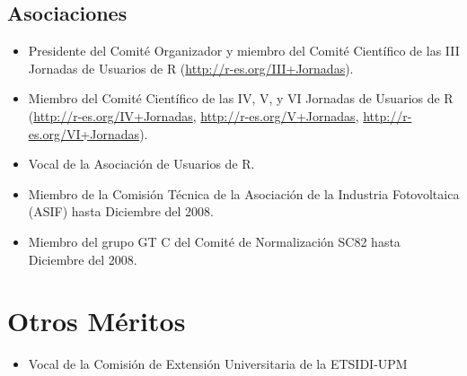 \documentclass[article, a4paper]{memoir}
\begin{document}
\subsection{Asociaciones}
\label{sec-15-4}

\begin{itemize}
\item Presidente del Comité Organizador y miembro del Comité Científico de las III Jornadas de Usuarios de R (\url{http://r-es.org/III+Jornadas}).

\item Miembro del Comité Científico de las IV, V, y VI Jornadas de Usuarios de R (\url{http://r-es.org/IV+Jornadas}, \url{http://r-es.org/V+Jornadas}, \url{http://r-es.org/VI+Jornadas}).

\item Vocal de la Asociación de Usuarios de R.

\item Miembro de la Comisión Técnica de la Asociación de la Industria Fotovoltaica (ASIF) hasta Diciembre del 2008.

\item Miembro del grupo GT C del Comité de Normalización SC82 hasta Diciembre del 2008.
\end{itemize}

\section{Otros Méritos}
\label{sec-16}
\begin{itemize}
\item Vocal de la Comisión de Extensión Universitaria de la ETSIDI-UPM
\end{itemize}
\end{document}
